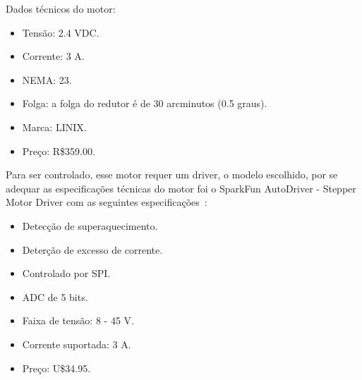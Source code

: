 Dados técnicos do motor:

\begin{itemize}
	\item Tensão: 2.4 VDC.
	\item Corrente: 3 A.
	\item NEMA: 23.
	\item Folga: a folga do redutor é de 30 arcminutos (0.5 graus).
	\item Marca: LINIX.
	\item Preço: R\$359.00.
\end{itemize}

Para ser controlado, esse motor requer um driver, o modelo escolhido, por se adequar as especificações técnicas do motor foi o SparkFun AutoDriver - Stepper Motor Driver com as seguintes especificações~\cite{pololu}:

\begin{itemize}
	\item Detecção de superaquecimento.
	\item Deterção de excesso de corrente.
	\item Controlado por SPI.
	\item ADC de 5 bits.
	\item Faixa de tensão: 8 - 45 V.
	\item Corrente suportada: 3 A.
	\item Preço: U\$34.95.
\end{itemize}
